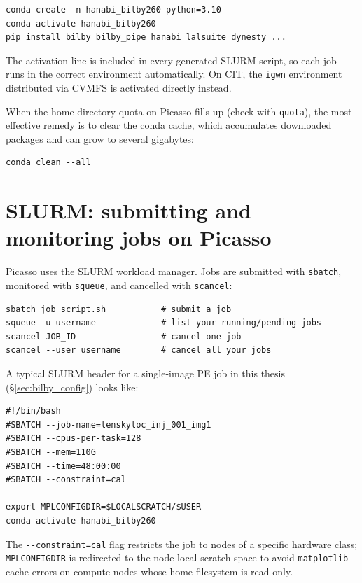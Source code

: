 \begin{verbatim}
conda create -n hanabi_bilby260 python=3.10
conda activate hanabi_bilby260
pip install bilby bilby_pipe hanabi lalsuite dynesty ...
\end{verbatim}

The activation line is included in every generated SLURM script, so each job runs in the correct environment automatically. On CIT, the \texttt{igwn} environment distributed via CVMFS is activated directly instead.

When the home directory quota on Picasso fills up (check with \texttt{quota}), the most effective remedy is to clear the conda cache, which accumulates downloaded packages and can grow to several gigabytes:

\begin{verbatim}
conda clean --all
\end{verbatim}

\section{SLURM: submitting and monitoring jobs on Picasso}

Picasso uses the SLURM workload manager. Jobs are submitted with \texttt{sbatch}, monitored with \texttt{squeue}, and cancelled with \texttt{scancel}:

\begin{verbatim}
sbatch job_script.sh           # submit a job
squeue -u username             # list your running/pending jobs
scancel JOB_ID                 # cancel one job
scancel --user username        # cancel all your jobs
\end{verbatim}

A typical SLURM header for a single-image PE job in this thesis (\S\ref{sec:bilby_config}) looks like:

\begin{verbatim}
#!/bin/bash
#SBATCH --job-name=lenskyloc_inj_001_img1
#SBATCH --cpus-per-task=128
#SBATCH --mem=110G
#SBATCH --time=48:00:00
#SBATCH --constraint=cal

export MPLCONFIGDIR=$LOCALSCRATCH/$USER
conda activate hanabi_bilby260
\end{verbatim}

The \texttt{-{}-constraint=cal} flag restricts the job to nodes of a specific hardware class; \texttt{MPLCONFIGDIR} is redirected to the node-local scratch space to avoid \texttt{matplotlib} cache errors on compute nodes whose home filesystem is read-only.

